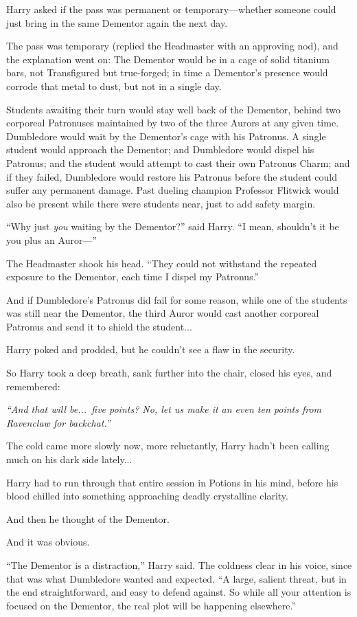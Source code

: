 Harry asked if the pass was permanent or temporary—whether someone could just bring in the same Dementor again the next day.

The pass was temporary (replied the Headmaster with an approving nod), and the explanation went on: The Dementor would be in a cage of solid titanium bars, not Transfigured but true-forged; in time a Dementor’s presence would corrode that metal to dust, but not in a single day.

Students awaiting their turn would stay well back of the Dementor, behind two corporeal Patronuses maintained by two of the three Aurors at any given time. Dumbledore would wait by the Dementor’s cage with his Patronus. A single student would approach the Dementor; and Dumbledore would dispel his Patronus; and the student would attempt to cast their own Patronus Charm; and if they failed, Dumbledore would restore his Patronus before the student could suffer any permanent damage. Past dueling champion Professor Flitwick would also be present while there were students near, just to add safety margin.

“Why just \emph{you} waiting by the Dementor?” said Harry. “I mean, shouldn’t it be you plus an Auror—”

The Headmaster shook his head. “They could not withstand the repeated exposure to the Dementor, each time I dispel my Patronus.”

And if Dumbledore’s Patronus did fail for some reason, while one of the students was still near the Dementor, the third Auror would cast another corporeal Patronus and send it to shield the student...

Harry poked and prodded, but he couldn’t see a flaw in the security.

So Harry took a deep breath, sank further into the chair, closed his eyes, and remembered:

\emph{“And that will be...\ five points? No, let us make it an even ten points from Ravenclaw for backchat.”}

The cold came more slowly now, more reluctantly, Harry hadn’t been calling much on his dark side lately...

Harry had to run through that entire session in Potions in his mind, before his blood chilled into something approaching deadly crystalline clarity.

And then he thought of the Dementor.

And it was obvious.

“The Dementor is a distraction,” Harry said. The coldness clear in his voice, since that was what Dumbledore wanted and expected. “A large, salient threat, but in the end straightforward, and easy to defend against. So while all your attention is focused on the Dementor, the real plot will be happening elsewhere.”

